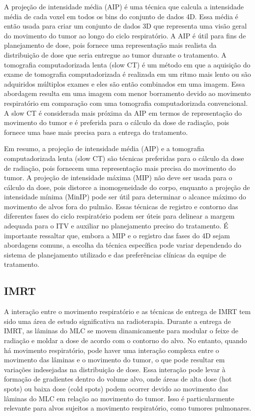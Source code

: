 \documentclass[11pt,a4paper]{article}
\begin{document}
	A projeção de intensidade média (AIP) é uma técnica que calcula a intensidade média de cada voxel em todos os bins do conjunto de dados 4D. Essa média é então usada para criar um conjunto de dados 3D que representa uma visão geral do movimento do tumor ao longo do ciclo respiratório. A AIP é útil para fins de planejamento de dose, pois fornece uma representação mais realista da distribuição de dose que seria entregue ao tumor durante o tratamento. A tomografia computadorizada lenta (slow CT) é um método em que a aquisição do exame de tomografia computadorizada é realizada em um ritmo mais lento ou são adquiridos múltiplos exames e eles são então combinados em uma imagem. Essa abordagem resulta em uma imagem com menor borramento devido ao movimento respiratório em comparação com uma tomografia computadorizada convencional. A slow CT é considerada mais próxima da AIP em termos de representação do movimento do tumor e é preferida para o cálculo da dose de radiação, pois fornece uma base mais precisa para a entrega do tratamento.  

	Em resumo, a projeção de intensidade média (AIP) e a tomografia computadorizada lenta (slow CT) são técnicas preferidas para o cálculo da dose de radiação, pois fornecem uma representação mais precisa do movimento do tumor. A projeção de intensidade máxima (MIP) não deve ser usada para o cálculo da dose, pois distorce a inomogeneidade do corpo, enquanto a projeção de intensidade mínima (MinIP) pode ser útil para determinar o alcance máximo do movimento de alvos fora do pulmão. Essas técnicas de registro e contorno das diferentes fases do ciclo respiratório podem ser úteis para delinear a margem adequada para o ITV e auxiliar no planejamento preciso do tratamento. É importante ressaltar que, embora a MIP e o registro das fases do 4D sejam abordagens comuns, a escolha da técnica específica pode variar dependendo do sistema de planejamento utilizado e das preferências clínicas da equipe de tratamento. 

\subsection*{IMRT}

	A interação entre o movimento respiratório e as técnicas de entrega de IMRT tem sido uma área de estudo significativa na radioterapia. Durante a entrega de IMRT, as lâminas do MLC se movem dinamicamente para modular o feixe de radiação e moldar a dose de acordo com o contorno do alvo. No entanto, quando há movimento respiratório, pode haver uma interação complexa entre o movimento das lâminas e o movimento do tumor, o que pode resultar em variações indesejadas na distribuição de dose. Essa interação pode levar à formação de gradientes dentro do volume alvo, onde áreas de alta dose (hot spots) ou baixa dose (cold spots) podem ocorrer devido ao movimento das lâminas do MLC em relação ao movimento do tumor. Isso é particularmente relevante para alvos sujeitos a movimento respiratório, como tumores pulmonares.
\end{document}
